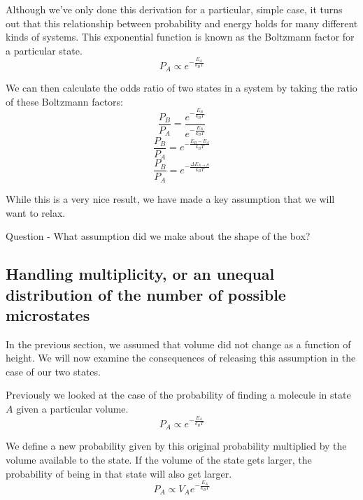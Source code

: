 Although we've only done this derivation for a particular, simple case, it turns out that this relationship between probability and energy holds for many different kinds of systems. 
This exponential function is known as the Boltzmann factor for a particular state.
\begin{equation}
    P_A \propto e^{-\frac{E_A}{k_BT}}\label{eq:bd1}
\end{equation}

We can then calculate the odds ratio of two states in a system by taking the ratio of these Boltzmann factors:
\begin{equation}
    \frac{P_B}{P_A} = \frac{e^{-\frac{E_B}{k_BT}}}{e^{-\frac{E_A}{k_BT}}}
\end{equation}
\begin{equation}
\frac{P_B}{P_A} = e^{-\frac{E_B - E_A}{k_BT}} \label{eq:bd3}
\end{equation}
\begin{equation}
\frac{P_B}{P_A} = e^{-\frac{\Delta E_{A \rightarrow B}}{k_BT}} \label{eq:bd3}
\end{equation}

While this is a very nice result, we have made a key assumption that we will want to relax.

\begin{keynote}
Question - What assumption did we make about the shape of the box?
\end{keynote}

\subsection{Handling multiplicity, or an unequal distribution of the number of possible microstates}

In the previous section, we assumed that volume did not change as a function of height.
We will now examine the consequences of releasing this assumption in the case of our two states.

Previously we looked at the case of the probability of finding a molecule in state $A$ given a particular volume. 
\begin{equation}
    P_{A} \propto e^{-\frac{E_A}{k_BT}} \label{eq:bf}
\end{equation}

We define a new probability given by this original probability multiplied by the volume available to the state.
If the volume of the state gets larger, the probability of being in that state will also get larger.
\begin{equation}
    P_A \propto V_Ae^{-\frac{E_A}{k_BT}}
\end{equation}

